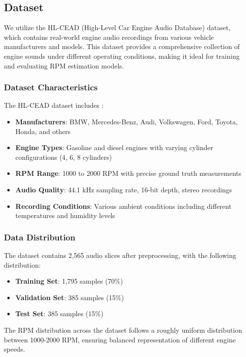 \documentclass[journal,10pt]{IEEEtran}
\begin{document}
\subsection{Dataset}

We utilize the HL-CEAD (High-Level Car Engine Audio Database) dataset, which contains real-world engine audio recordings from various vehicle manufacturers and models. This dataset provides a comprehensive collection of engine sounds under different operating conditions, making it ideal for training and evaluating RPM estimation models.

\subsubsection{Dataset Characteristics}

The HL-CEAD dataset includes \cite{ZHONGGUO}:
\begin{itemize}
    \item \textbf{Manufacturers}: BMW, Mercedes-Benz, Audi, Volkswagen, Ford, Toyota, Honda, and others
    \item \textbf{Engine Types}: Gasoline and diesel engines with varying cylinder configurations (4, 6, 8 cylinders)
    \item \textbf{RPM Range}: 1000 to 2000 RPM with precise ground truth measurements
    \item \textbf{Audio Quality}: 44.1 kHz sampling rate, 16-bit depth, stereo recordings
    \item \textbf{Recording Conditions}: Various ambient conditions including different temperatures and humidity levels
\end{itemize}

\subsubsection{Data Distribution}

The dataset contains 2,565 audio slices after preprocessing, with the following distribution:
\begin{itemize}
    \item \textbf{Training Set}: 1,795 samples (70\%)
    \item \textbf{Validation Set}: 385 samples (15\%)
    \item \textbf{Test Set}: 385 samples (15\%)
\end{itemize}

The RPM distribution across the dataset follows a roughly uniform distribution between 1000-2000 RPM, ensuring balanced representation of different engine speeds.
\end{document}
